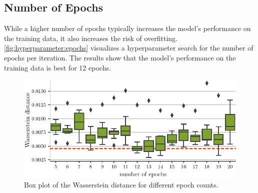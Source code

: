 \subsection{Number of Epochs}
While a higher number of epochs typically increases the model's performance on the training data,
it also increases the risk of overfitting.
%
\autoref{fig:hyperparameter:epochs} visualizes a hyperparameter search for the number of epochs per \dsea{} iteration.
The results show that the model's performance on the training data is best for \num{12} epochs.

\begin{figure}
  \centering
  \includegraphics[width=\textwidth]{content/plots/hyperparam/num_epochs_vs_wd_boxplot_lessheight.pdf}
  \caption{Box plot of the Wasserstein distance for different epoch counts.}
  \label{fig:hyperparameter:epochs}
\end{figure}
